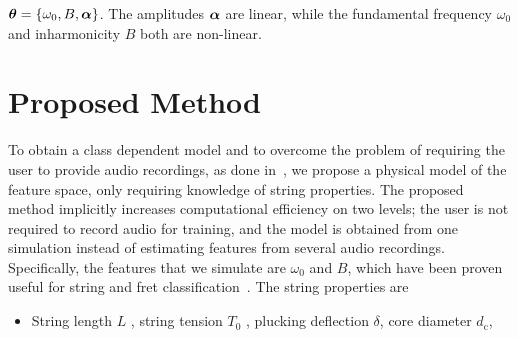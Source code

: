\documentclass{article}
\begin{document}
\begin{sloppy}
  $\text{\boldmath$\theta$} = \{\omega_0, B, \text{\boldmath$\alpha$}\}$.
The amplitudes $\text{\boldmath$\alpha$}$ are linear, while the fundamental frequency $\omega_0$ and inharmonicity $B$ both are non-linear. 
%
%
%
\section{Proposed Method}\label{sec:proposed_method}
To obtain a class dependent model and to overcome the problem of requiring the user to provide audio recordings, as done in~\cite{abesser:automatic_string_detection_ml,barbancho:inharmonicity_tablature,michelson2018_aes,hjerrild::icassp19}, we propose a physical model of the feature space, only requiring knowledge of string properties. The proposed method implicitly increases computational efficiency on two levels; the user is not required to record audio for training, and the model is obtained from one simulation instead of estimating features from several audio recordings. Specifically, the features that we simulate are ${\omega}_0$ and $B$, which have been proven useful for string and fret classification~\cite{barbancho:inharmonicity_tablature, michelson2018_aes,hjerrild::icassp19}. The string properties are
\begin{itemize}
    \item String length $L$%
    , string tension $T_0$%
    , plucking deflection $\delta$, %
    core diameter $ d_\text{c}$, %

\end{itemize}
\end{sloppy}
\end{document}
